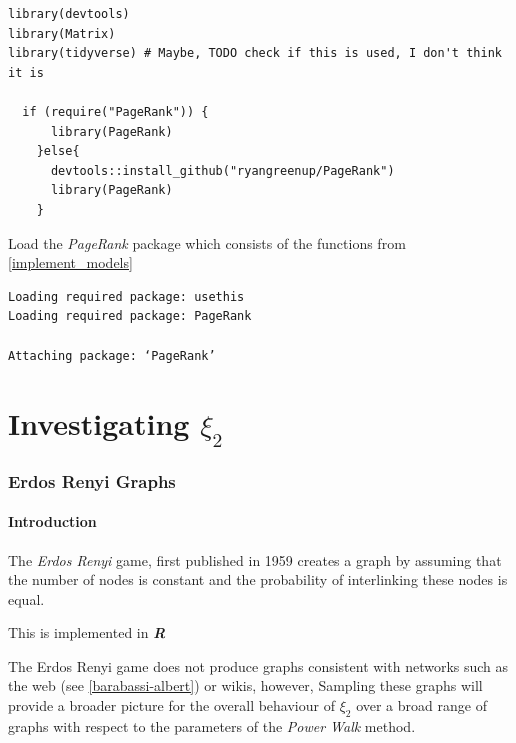 \documentclass[11pt]{article}
\begin{document}
\begin{listing}[htbp]
\begin{verbatim}
library(devtools)
library(Matrix)
library(tidyverse) # Maybe, TODO check if this is used, I don't think it is

  if (require("PageRank")) {
      library(PageRank)
    }else{
      devtools::install_github("ryangreenup/PageRank")
      library(PageRank)
    }

\end{verbatim}
\caption{\label{}Load the \emph{PageRank} package which consists of the functions from \ref{implement_models}}
\end{listing}

\begin{verbatim}
Loading required package: usethis
Loading required package: PageRank

Attaching package: ‘PageRank’
\end{verbatim}


\part{Investigating \(\xi_{2}\)}
\section{Erdos Renyi Graphs}
\label{erdos-renyi}
\subsection{Introduction}
\label{sec:org56225bf}
The \emph{Erdos Renyi} game, first published in 1959 \cite{renyiRandomGraphs1959} creates a graph by assuming that the number of nodes is constant and the probability of interlinking these nodes is equal.

This is implemented in \textbf{\emph{R}} \cite[IgraphManualPagesa]{IgraphManualPages}

The Erdos Renyi game does not produce graphs consistent with networks such as
the web (see \ref{barabassi-albert}) or wikis, however, Sampling these graphs will
provide a broader picture for the overall behaviour of \(\xi_{2}\) over a broad
range of graphs with respect to the parameters of the \emph{Power Walk} method.
\end{document}
